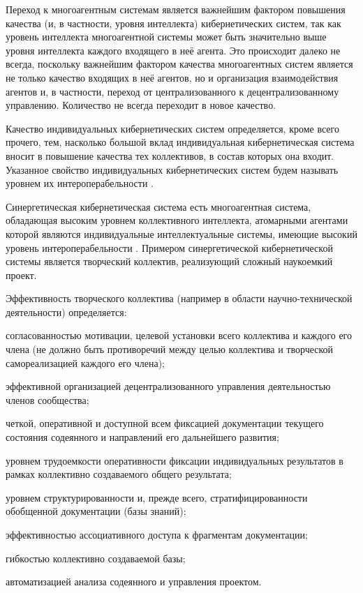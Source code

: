 {\label{sec_mas_overall_quality}} 

Переход к многоагентным системам является важнейшим фактором повышения качества (и, в частности, уровня интеллекта) кибернетических систем, так как уровень интеллекта многоагентной системы может быть значительно выше уровня интеллекта каждого входящего в неё агента. 
Это происходит далеко не всегда, поскольку важнейшим фактором качества многоагентных систем является не только качество входящих в неё агентов, но и организация взаимодействия агентов и, в частности, переход от централизованного к децентрализованному управлению. 
Количество не всегда переходит в новое качество.

Качество индивидуальных кибернетических систем определяется, кроме всего прочего, тем, насколько большой вклад индивидуальная кибернетическая система вносит в повышение качества тех коллективов, в состав которых она входит.
Указанное свойство индивидуальных кибернетических систем будем называть уровнем их интероперабельности .

Синергетическая кибернетическая система есть многоагентная система, обладающая высоким уровнем коллективного интеллекта, атомарными агентами которой являются индивидуальные интеллектуальные системы, имеющие высокий уровень интероперабельности  .
Примером синергетической кибернетической системы является творческий коллектив, реализующий сложный наукоемкий проект.

Эффективность творческого коллектива (например в области научно-технической деятельности) определяется:
\begin{textitemize}
    \item согласованностью мотивации, целевой установки всего коллектива и каждого его члена (не должно быть противоречий между целью коллектива и творческой самореализацией каждого его члена);
    \item эффективной организацией децентрализованного управления деятельностью членов сообщества;
    \item четкой, оперативной и доступной всем фиксацией документации текущего состояния содеянного и направлений его дальнейшего развития;
    \item уровнем трудоемкости оперативности фиксации индивидуальных результатов в рамках коллективно создаваемого общего результата;
    \item уровнем структурированности и, прежде всего, стратифицированности обобщенной документации (базы знаний);
    \item эффективностью ассоциативного доступа к фрагментам документации;
    \item гибкостью коллективно создаваемой базы;
    \item автоматизацией анализа содеянного и управления проектом.
\end{textitemize}

